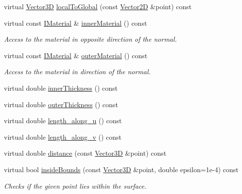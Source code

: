 \begin{DoxyCompactItemize}
\item 
virtual \hyperlink{class_d_d_surfaces_1_1_vector3_d}{Vector3D} \hyperlink{class_d_d4hep_1_1_d_d_rec_1_1_vol_surface_a282f3288c62a9f794f25f6519d1a2f4d}{local\+To\+Global} (const \hyperlink{class_d_d_surfaces_1_1_vector2_d}{Vector2D} \&point) const
\item 
virtual const \hyperlink{class_d_d_surfaces_1_1_i_material}{I\+Material} \& \hyperlink{class_d_d4hep_1_1_d_d_rec_1_1_vol_surface_a102814166f4ba579d3587ed0b5284aa4}{inner\+Material} () const
\begin{DoxyCompactList}\small\item\em Access to the material in opposite direction of the normal. \end{DoxyCompactList}\item 
virtual const \hyperlink{class_d_d_surfaces_1_1_i_material}{I\+Material} \& \hyperlink{class_d_d4hep_1_1_d_d_rec_1_1_vol_surface_af554b5cbe4e227c37443c5bddbc3ca3b}{outer\+Material} () const
\begin{DoxyCompactList}\small\item\em Access to the material in direction of the normal. \end{DoxyCompactList}\item 
virtual double \hyperlink{class_d_d4hep_1_1_d_d_rec_1_1_vol_surface_a78818e330968041cb17c0694d380ff3f}{inner\+Thickness} () const
\item 
virtual double \hyperlink{class_d_d4hep_1_1_d_d_rec_1_1_vol_surface_ac2113d966dce09b9f714a14a0e0f45c8}{outer\+Thickness} () const
\item 
virtual double \hyperlink{class_d_d4hep_1_1_d_d_rec_1_1_vol_surface_ad36f7614fbe777044e50e5f5fa5997de}{length\+\_\+along\+\_\+u} () const
\item 
virtual double \hyperlink{class_d_d4hep_1_1_d_d_rec_1_1_vol_surface_aedd64d718c81b62fdad1094379190f81}{length\+\_\+along\+\_\+v} () const
\item 
virtual double \hyperlink{class_d_d4hep_1_1_d_d_rec_1_1_vol_surface_aa619b563fdbb84fe93d7b983d2ab277c}{distance} (const \hyperlink{class_d_d_surfaces_1_1_vector3_d}{Vector3D} \&point) const
\item 
virtual bool \hyperlink{class_d_d4hep_1_1_d_d_rec_1_1_vol_surface_abb5047e09cf8ccb538b3f97766321c9e}{inside\+Bounds} (const \hyperlink{class_d_d_surfaces_1_1_vector3_d}{Vector3D} \&point, double epsilon=1e-\/4) const
\begin{DoxyCompactList}\small\item\em Checks if the given point lies within the surface. \end{DoxyCompactList}\item 

\end{DoxyCompactItemize}
